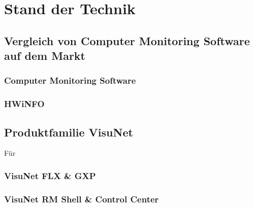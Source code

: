 \chapter{Stand der Technik}

\section{Vergleich von Computer Monitoring Software auf dem Markt}
\subsection{Computer Monitoring Software}
\subsection{HWiNFO}

\section{Produktfamilie VisuNet}
Für 
\subsection{VisuNet FLX \& GXP}
\subsection{VisuNet RM Shell \& Control Center}

